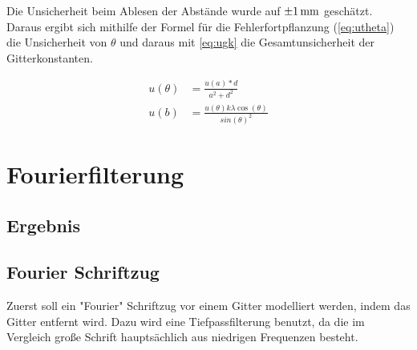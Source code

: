 Die Unsicherheit beim Ablesen der Abstände wurde auf $\SI{\pm1}{mm}$ geschätzt. Daraus ergibt sich mithilfe der Formel für die Fehlerfortpflanzung (\cref{eq:utheta}) die Unsicherheit von $\theta$ und daraus mit \cref{eq:ugk} die Gesamtunsicherheit der Gitterkonstanten.

\begin{align}
u(\theta) &= \frac{u(a)*d}{a^2 +d^2}
\label{eq:utheta}\\
u(b) &= \frac{u(\theta) k \lambda \cos(\theta)}{sin(\theta)^2}
\label{eq:ugk}
\end{align}

\section{Fourierfilterung}
\subsection{Ergebnis}
\subsection{Fourier Schriftzug}
Zuerst soll ein "Fourier" Schriftzug vor einem Gitter modelliert werden, indem das Gitter entfernt wird. Dazu wird eine Tiefpassfilterung benutzt, da die im Vergleich große Schrift hauptsächlich aus niedrigen Frequenzen besteht. 


